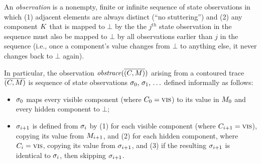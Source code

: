 \documentclass[conference]{IEEEtran}
\begin{document}
An {\em observation} is a nonempty, finite or infinite sequence of state
observations in which (1) adjacent elements are always distinct (``no
stuttering'') and (2) any component $K$ that is mapped to $\bot$ by
the the $j^{th}$ state observation in the sequence must also be mapped to
$\bot$ by all observations earlier than $j$ in the sequence (i.e., once a
component's value changes from $\bot$ to anything else, it never changes
back to $\bot$ again).
 
In particular, the observation $\mathit{obstrace}(\overline{(C,M)})$ arising
from a contoured trace $\overline{(C,M)}$ is sequence of state
observations $\sigma_0,\, \sigma_1,\, \ldots$ defined informally as
follows:
\begin{itemize}
\item $\sigma_0$ maps every visible component (where $C_0 = \textsc{vis}$)
to its value in $M_0$ and every hidden
component to $\bot$; 
\item $\sigma_{i+1}$ is defined from $\sigma_{i}$ by (1) for each
visible component (where $C_{i+1} = \textsc{vis}$), copying its
value from $M_{i+1}$, and (2) for each
hidden component, where $C_i = \textsc{vis}$, copying its
value from $\sigma_{i+1}$, and (3) if the resulting $\sigma_{i+1}$ is
identical to $\sigma_{i}$, then skipping $\sigma_{i+1}$.
\iftext{}\fi
\end{itemize}

\end{document}
